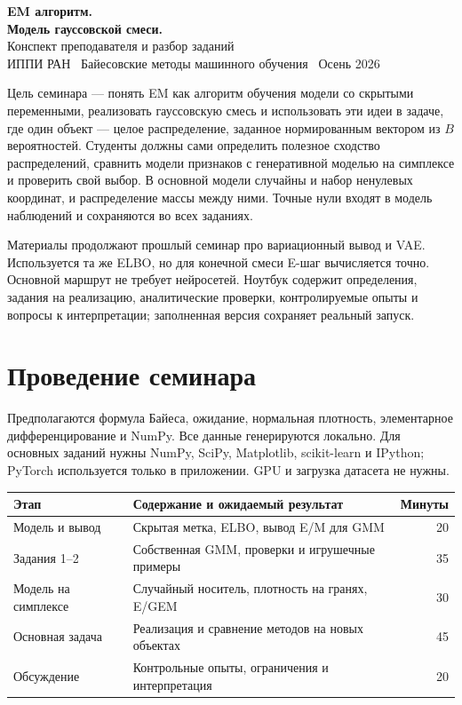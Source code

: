 \documentclass[11pt,a4paper]{article}
\begin{document}
\begin{center}
 {\LARGE\bfseries EM алгоритм.\\[3pt] Модель гауссовской смеси.}\\[7pt]
 {\large Конспект преподавателя и разбор заданий}\\[4pt]
 ИППИ РАН \textbar\ Байесовские методы машинного обучения \textbar\ Осень 2026
\end{center}

Цель семинара --- понять EM как алгоритм обучения модели со скрытыми
переменными, реализовать гауссовскую смесь и использовать эти идеи в задаче,
где один объект --- целое распределение, заданное нормированным вектором
из $B$ вероятностей. Студенты должны сами определить полезное сходство
распределений, сравнить модели признаков с генеративной моделью на
симплексе и проверить свой выбор. В основной модели случайны и набор
ненулевых координат, и распределение массы между ними. Точные нули входят
в модель наблюдений и сохраняются во всех заданиях.

Материалы продолжают прошлый семинар про вариационный вывод и VAE.
Используется та же ELBO, но для конечной смеси E-шаг вычисляется точно.
Основной маршрут не требует нейросетей. Ноутбук содержит определения,
задания на реализацию, аналитические проверки, контролируемые опыты и
вопросы к интерпретации; заполненная версия сохраняет реальный запуск.

\section{Проведение семинара}

Предполагаются формула Байеса, ожидание, нормальная плотность, элементарное
дифференцирование и NumPy. Все данные генерируются локально.
Для основных заданий нужны NumPy, SciPy, Matplotlib, scikit-learn и IPython;
PyTorch используется только в приложении. GPU и загрузка датасета не нужны.

\begin{center}
\begin{tabular}{p{.19\linewidth}p{.63\linewidth}r}
\toprule
Этап & Содержание и ожидаемый результат & Минуты\\
\midrule
Модель и вывод & Скрытая метка, ELBO, вывод E/M для GMM & 20\\
Задания 1--2 & Собственная GMM, проверки и игрушечные примеры & 35\\
Модель на симплексе & Случайный носитель, плотность на гранях, E/GEM & 30\\
Основная задача & Реализация и сравнение методов на новых объектах & 45\\
Обсуждение & Контрольные опыты, ограничения и интерпретация & 20\\
\bottomrule
\end{tabular}
\end{center}
\end{document}
